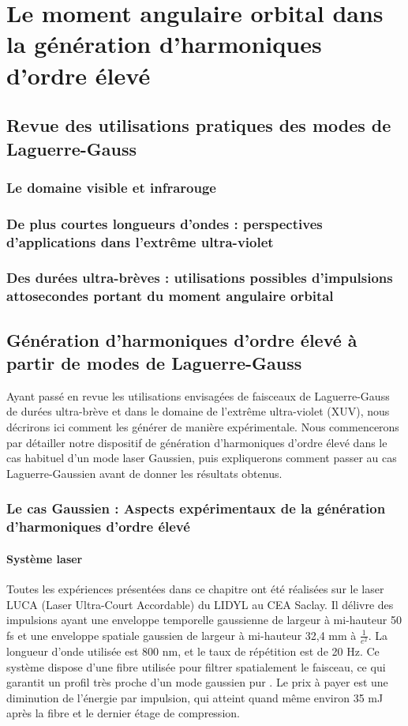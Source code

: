 \chapter{Le moment angulaire orbital dans la génération d'harmoniques d'ordre élevé}
\label{CH:OAM_HHG}
%
\section{Revue des utilisations pratiques des modes de Laguerre-Gauss}
\subsection{Le domaine visible et infrarouge}
\subsection{De plus courtes longueurs d'ondes : perspectives d'applications dans l'extrême ultra-violet}
\subsection{Des durées ultra-brèves : utilisations possibles d'impulsions attosecondes portant du moment angulaire orbital}

\section{Génération d'harmoniques d'ordre élevé à partir de modes de Laguerre-Gauss}

Ayant passé en revue les utilisations envisagées de faisceaux de Laguerre-Gauss de durées ultra-brève et dans le domaine de l'extrême ultra-violet (XUV), nous décrirons ici comment les générer de manière expérimentale. Nous commencerons par détailler notre dispositif de génération d'harmoniques d'ordre élevé dans le cas habituel d'un mode laser Gaussien, puis expliquerons comment passer au cas Laguerre-Gaussien avant de donner les résultats obtenus.

\subsection{Le cas Gaussien : Aspects expérimentaux de la génération d'harmoniques d'ordre élevé}
\subsubsection{Système laser}
Toutes les expériences présentées dans ce chapitre ont été réalisées sur le laser LUCA (Laser Ultra-Court Accordable) du LIDYL au CEA Saclay. Il délivre des impulsions ayant une enveloppe temporelle gaussienne de largeur à mi-hauteur 50 fs et une enveloppe spatiale gaussien de largeur à mi-hauteur 32,4 mm à $\frac{1}{e^2}$. La longueur d'onde utilisée est 800 nm, et le taux de répétition est de 20 Hz. Ce système dispose d'une fibre utilisée pour filtrer spatialement le faisceau, ce qui garantit un profil très proche d'un mode gaussien pur . Le prix à payer est une diminution de l'énergie par impulsion, qui atteint quand même environ 35 mJ après la fibre et le dernier étage de compression.

